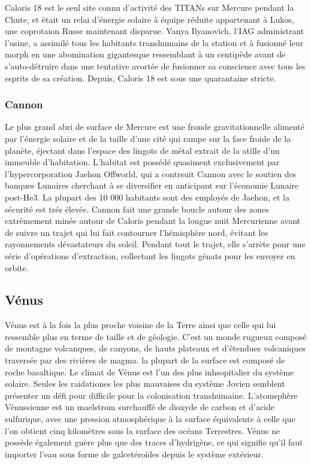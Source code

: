                                                       Caloris 18 est le seul site connu d'activité des TITANs sur Mercure pendant la Chute, et était un relai d'énergie solaire à équipe réduite appartenant à Lukos, une coprotaion Russe maintenant disparue. Vanya Ilyanovich, l'IAG administrant l'usine, a assimilé tous les habitants transhumains de la station et à fusionné leur morph en une abomination gigantesque ressemblant à un centipède avant de s'auto-détruire dans une tentative avortée de fusionner sa conscience avec tous les esprits de sa création. Depuis, Caloris 18 est sous une quarantaine stricte. 

                                                      \subsubsection{Cannon} \label{sec:cannon} 

                                                      Le plus grand abri de surface de Mercure est une fronde gravitationnelle alimenté par l'énergie solaire et de la taille d'une cité qui rampe sur la face froide de la planète, éjectant dans l'espace des lingots de métal extrait de la atille d'un immeuble d'habitation. L'habitat est possédé quasiment exclusivement par l'hypercorporation Jaehon Offworld, qui a contrsuit Cannon avec le soutien des banques Lunaires cherchant à se diversifier en anticipant sur l'économie Lunaire post-He3. La plupart des 10 000 habitants sont des employés de Jaehon, et la sécurité est trés élevée. Cannon fait une grande boucle autour des zones extrêmement minée autour de Caloris pendant la longue nuit Mercurienne avant de suivre un trajet qui lui fait contourner l'hémisphère nord, évitant les rayonnements dévastateurs du soleil. Pendant tout le trajet, elle s'arrète pour une série d'opérations d'extraction, collectant les lingots génats pour les envoyer en orbite. 

                                                      \subsection{Vénus} \label{sec:venus} 

                                                      Vénus est à la fois la plus proche voisine de la Terre ainsi que celle qui lui ressemble plus en terme de taille et de géologie. C'est un monde rugueux composé de montagne volcanques, de canyons, de hauts plateaux et d'étendues volcaniques traversée par des rivières de magma. la plupart de la surface est composé de roche basaltique. Le climat de Vénus est l'un des plus inhsopitalier du système solaire. Seules les raidationes les plus mauvaises du système Jovien semblent présenter un défi pour difficile pour la colonisation transhumaine. L'atomsphère Vénussienne est un maelstrom surchauffé de dioxyde de carbon et d'acide sulfurique, avec une pression atmosphérique à la surface équivalente à celle que l'on obtient cinq kilomètres sous la surface des océans Terrestres. Vénus ne possède également guère plus que des traces d'hydrigène, ce qui signifie qu'il faut importer l'eau sous forme de galcetéroïdes depuis le système extérieur. 


